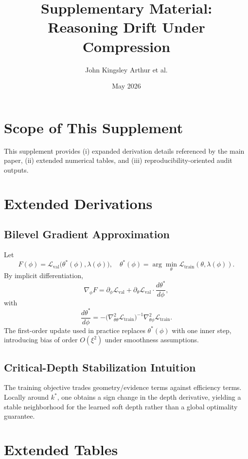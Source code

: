\documentclass[11pt]{article}
\title{Supplementary Material: Reasoning Drift Under Compression}
\author{John Kingsley Arthur et al.}
\date{May 2026}
\begin{document}
\maketitle

\section{Scope of This Supplement}
This supplement provides (i) expanded derivation details referenced by the main paper,
(ii) extended numerical tables, and (iii) reproducibility-oriented audit outputs.

\section{Extended Derivations}
\subsection{Bilevel Gradient Approximation}
Let
\begin{equation}
F(\phi)=\mathcal{L}_{\mathrm{val}}\big(\theta^*(\phi),\lambda(\phi)\big), \quad
\theta^*(\phi)=\arg\min_{\theta}\mathcal{L}_{\mathrm{train}}(\theta,\lambda(\phi)).
\end{equation}
By implicit differentiation,
\begin{equation}
\nabla_\phi F
=\partial_\phi \mathcal{L}_{\mathrm{val}} +
\partial_\theta \mathcal{L}_{\mathrm{val}}\cdot
\frac{d\theta^*}{d\phi},
\end{equation}
with
\begin{equation}
\frac{d\theta^*}{d\phi}= -\big(\nabla^2_{\theta\theta}\mathcal{L}_{\mathrm{train}}\big)^{-1}
\nabla^2_{\theta\phi}\mathcal{L}_{\mathrm{train}}.
\end{equation}
The first-order update used in practice replaces $\theta^*(\phi)$ with one inner step,
introducing bias of order $O(\xi^2)$ under smoothness assumptions.

\subsection{Critical-Depth Stabilization Intuition}
The training objective trades geometry/evidence terms against efficiency terms. Locally around
$k^*$, one obtains a sign change in the depth derivative, yielding a stable neighborhood
for the learned soft depth rather than a global optimality guarantee.

\section{Extended Tables}
\end{document}
